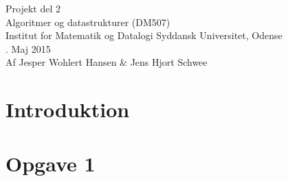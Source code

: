 \documentclass{article}
\begin{document}
{\centering
\huge
Projekt del 2\\
Algoritmer og datastrukturer (DM507)\\
\large
\bigskip
Institut for Matematik og Datalogi Syddansk Universitet, Odense\\
. Maj 2015\\
\bigskip
Af Jesper Wohlert Hansen \& Jens Hjort Schwee\\
}
\newpage

\section*{Introduktion}

\newpage

\section*{Opgave 1}

\newpage
\end{document}
